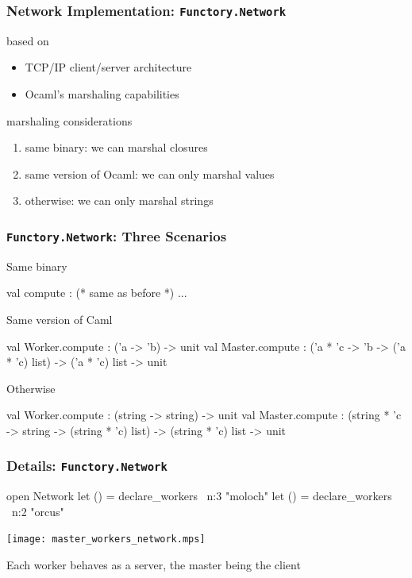 \documentclass[xcolor=dvipsnames,8pt]{beamer}
\let\emph\alert
\begin{document}


\begin{frame}\frametitle {Network Implementation: \texttt{Functory.Network}}
  based on
  \begin{itemize}
  \item TCP/IP client/server architecture
  \item Ocaml's marshaling capabilities
  \end{itemize}
  
  \vfill
  marshaling considerations
  \begin{enumerate}
  \item \emph{same binary}: we can marshal closures
  \item \emph{same version of Ocaml}: we can only marshal values
  \item \emph{otherwise}: we can only marshal strings
  \end{enumerate}
  
\end{frame}


\begin{frame}\frametitle {\texttt{Functory.Network}: Three Scenarios}
  
\emph{Same binary}
\begin{ocaml}
val compute : (* same as before *) ...
\end{ocaml}



\emph{Same version of Caml}
    \begin{ocaml}
val Worker.compute : ('a -> 'b) -> unit
val Master.compute : 
  ('a * 'c -> 'b -> ('a * 'c) list) ->
  ('a * 'c) list -> unit
\end{ocaml}



\emph{Otherwise}
    \begin{ocaml}
val Worker.compute : (string -> string) -> unit
val Master.compute : 
  (string * 'c -> string -> (string * 'c) list) ->
  (string * 'c) list -> unit
\end{ocaml}

\end{frame}


\begin{frame}\frametitle {Details: \texttt{Functory.Network}}
  \begin{ocaml}
  open Network
  let () = declare_workers ~n:3 "moloch"
  let () = declare_workers ~n:2 "orcus"
  \end{ocaml}

  \begin{center}
    \texttt{[image: master\_workers\_network.mps]}
  \end{center}
  Each worker behaves as a server, the master being the client
  
\end{frame}
\end{document}
